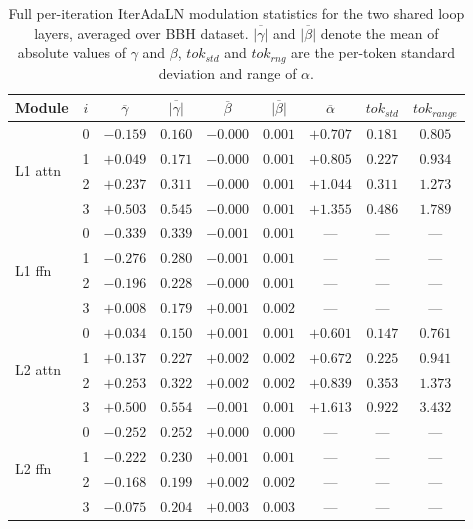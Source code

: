 \begin{table}[h]
\centering
\small
\setlength{\tabcolsep}{6pt}
\begin{tabular}{lcccccccc}
\toprule
Module & $i$ & $\overline{\gamma}$ & $\overline{|\gamma|}$ & $\overline{\beta}$ & $\overline{|\beta|}$ & $\overline{\alpha}$ & \textsc{$tok_{std}$} & \textsc{$tok_{range}$} \\
\midrule
\multirow{4}{*}{L1 attn} & 0 & $-0.159$ & $0.160$ & $-0.000$ & $0.001$ & $+0.707$ & $0.181$ & $0.805$ \\
                         & 1 & $+0.049$ & $0.171$ & $-0.000$ & $0.001$ & $+0.805$ & $0.227$ & $0.934$ \\
                         & 2 & $+0.237$ & $0.311$ & $-0.000$ & $0.001$ & $+1.044$ & $0.311$ & $1.273$ \\
                         & 3 & $+0.503$ & $0.545$ & $-0.000$ & $0.001$ & $+1.355$ & $0.486$ & $1.789$ \\
\midrule
\multirow{4}{*}{L1 ffn}  & 0 & $-0.339$ & $0.339$ & $-0.001$ & $0.001$ & --- & --- & --- \\
                         & 1 & $-0.276$ & $0.280$ & $-0.001$ & $0.001$ & --- & --- & --- \\
                         & 2 & $-0.196$ & $0.228$ & $-0.000$ & $0.001$ & --- & --- & --- \\
                         & 3 & $+0.008$ & $0.179$ & $+0.001$ & $0.002$ & --- & --- & --- \\
\midrule
\multirow{4}{*}{L2 attn} & 0 & $+0.034$ & $0.150$ & $+0.001$ & $0.001$ & $+0.601$ & $0.147$ & $0.761$ \\
                         & 1 & $+0.137$ & $0.227$ & $+0.002$ & $0.002$ & $+0.672$ & $0.225$ & $0.941$ \\
                         & 2 & $+0.253$ & $0.322$ & $+0.002$ & $0.002$ & $+0.839$ & $0.353$ & $1.373$ \\
                         & 3 & $+0.500$ & $0.554$ & $-0.001$ & $0.001$ & $+1.613$ & $0.922$ & $3.432$ \\
\midrule
\multirow{4}{*}{L2 ffn}  & 0 & $-0.252$ & $0.252$ & $+0.000$ & $0.000$ & --- & --- & --- \\
                         & 1 & $-0.222$ & $0.230$ & $+0.001$ & $0.001$ & --- & --- & --- \\
                         & 2 & $-0.168$ & $0.199$ & $+0.002$ & $0.002$ & --- & --- & --- \\
                         & 3 & $-0.075$ & $0.204$ & $+0.003$ & $0.003$ & --- & --- & --- \\
\bottomrule
\end{tabular}
\caption{Full per-iteration IterAdaLN modulation statistics for the two shared loop layers, averaged over BBH dataset. $\overline{|\gamma|}$ and $\overline{|\beta|}$ denote the mean of absolute values of $\gamma$ and $\beta$, \texttt{$tok_{std}$} and \texttt{$tok_{rng}$} are the per-token standard deviation and range of $\alpha$.}
\label{tab:adaln-stats-full}
\end{table}


